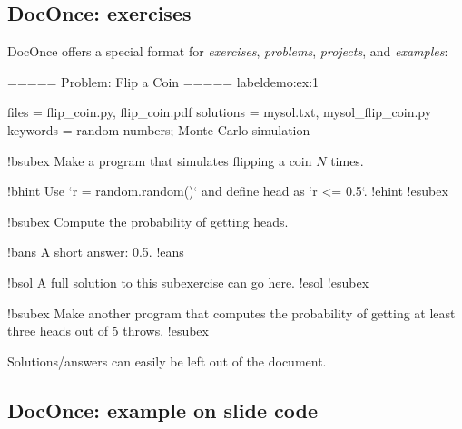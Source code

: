 \documentclass[%
oneside,                 %
final,                   %
10pt]{article}
\begin{document}
\subsection{DocOnce: exercises}

DocOnce offers a special format for \emph{exercises}, \emph{problems}, \emph{projects},
and \emph{examples}:

































\bdat
===== Problem: Flip a Coin =====
label{demo:ex:1}

files = flip_coin.py, flip_coin.pdf
solutions = mysol.txt, mysol_flip_coin.py
keywords = random numbers; Monte Carlo simulation

!bsubex
Make a program that simulates flipping a coin $N$ times.

!bhint
Use `r = random.random()` and define head as `r <= 0.5`.
!ehint
!esubex

!bsubex
Compute the probability of getting heads.

!bans
A short answer: 0.5.
!eans

!bsol
A full solution to this subexercise can go here.
!esol
!esubex

!bsubex
Make another program that computes the probability
of getting at least three heads out of 5 throws.
!esubex

\edat


Solutions/answers can easily be left out of the document.

\subsection{DocOnce: example on slide code}
\end{document}
